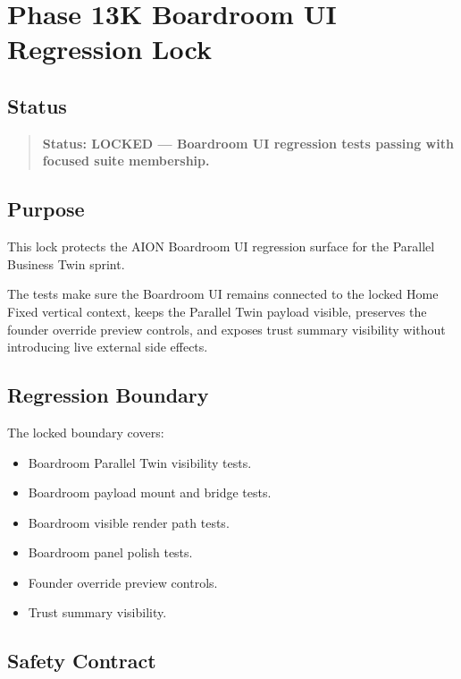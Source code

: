 \section{Phase 13K Boardroom UI Regression Lock}
\label{sec:phase13-boardroom-ui-regression-lock}

\subsection{Status}

\begin{quote}
\textbf{Status: LOCKED --- Boardroom UI regression tests passing with focused suite membership.}
\end{quote}

\subsection{Purpose}

This lock protects the AION Boardroom UI regression surface for the Parallel Business Twin sprint.

The tests make sure the Boardroom UI remains connected to the locked Home Fixed vertical context, keeps the Parallel Twin payload visible, preserves the founder override preview controls, and exposes trust summary visibility without introducing live external side effects.

\subsection{Regression Boundary}

The locked boundary covers:

\begin{itemize}
  \item Boardroom Parallel Twin visibility tests.
  \item Boardroom payload mount and bridge tests.
  \item Boardroom visible render path tests.
  \item Boardroom panel polish tests.
  \item Founder override preview controls.
  \item Trust summary visibility.
\end{itemize}

\subsection{Safety Contract}

